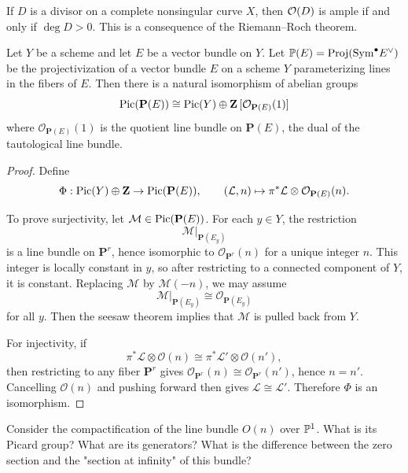 \documentclass[12pt]{article}
\begin{document}
\begin{example}
    If $D$ is a divisor on a complete nonsingular curve $X$, then $\mathcal \cO(D)$ is ample if and only if
    $\deg D > 0$. This is a consequence of the Riemann--Roch theorem.
\end{example}

\begin{proposition}
    Let $Y$ be a scheme and let $E$ be a vector bundle on $Y$.
    Let $\P(E) = \mathrm{Proj}(\mathrm{Sym}^\bullet E^\vee)$ be the projectivization of a vector bundle $E$ on a scheme $Y$ parameterizing lines in the fibers of $E$.  Then there is a natural isomorphism of abelian groups
    \[\Pic(\mathbf P(E))\cong \Pic(Y)\oplus \mathbf Z\,[\mathcal O_{\mathbf P(E)}(1)]\]
    where $\mathcal O_{\mathbf P(E)}(1)$ is the quotient line bundle on $\mathbf P(E)$, the dual of the tautological line bundle.
\end{proposition}

\begin{proof}
    Define
    \[
        \Phi:\Pic(Y)\oplus \mathbf Z\to \Pic(\mathbf P(E)),
        \qquad
        (\mathcal L,n)\mapsto \pi^*\mathcal L\otimes \mathcal O_{\mathbf P(E)}(n).
    \]

    To prove surjectivity, let \(\mathcal M\in \Pic(\mathbf P(E))\). For each \(y\in Y\), the restriction
    \[
        \mathcal M|_{\mathbf P(E_y)}
    \]
    is a line bundle on \(\mathbf P^r\), hence isomorphic to \(\mathcal O_{\mathbf P^r}(n)\) for a unique integer \(n\). This integer is locally constant in \(y\), so after restricting to a connected component of \(Y\), it is constant. Replacing \(\mathcal M\) by \(\mathcal M(-n)\), we may assume
    \[
        \mathcal M|_{\mathbf P(E_y)}\cong \mathcal O_{\mathbf P(E_y)}
    \]
    for all \(y\). Then the seesaw theorem implies that $\mathcal M$ is pulled back from \(Y\).

    For injectivity, if
    \[
        \pi^*\mathcal L\otimes \mathcal O(n)\cong \pi^*\mathcal L'\otimes \mathcal O(n'),
    \]
    then restricting to any fiber \(\mathbf P^r\) gives \(\mathcal O_{\mathbf P^r}(n)\cong \mathcal O_{\mathbf P^r}(n')\), hence \(n=n'\). Cancelling \(\mathcal O(n)\) and pushing forward then gives \(\mathcal L\cong \mathcal L'\). Therefore \(\Phi\) is an isomorphism.
\end{proof}

\begin{exercise}
    Consider the compactification of the line bundle $O(n)$ over $\P^1$. What is its Picard group? What are its generators? What is the difference between the zero section and the "section at infinity" of this bundle?
\end{exercise}
\end{document}
